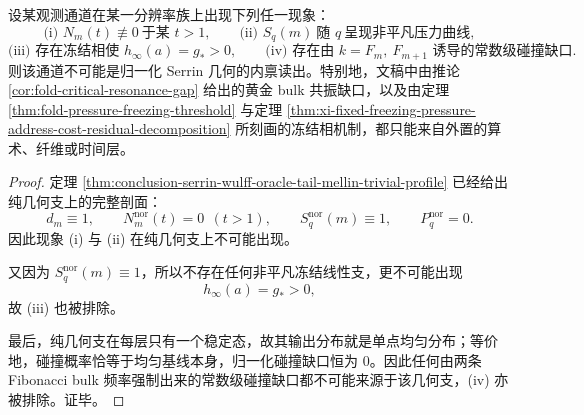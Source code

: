 \begin{corollary}\label{cor:conclusion-serrin-wulff-nontrivial-signatures-external-only}
设某观测通道在某一分辨率族上出现下列任一现象：
\[
\text{(i) }N_m(t)\not\equiv 0\ \text{于某 }t>1,
\qquad
\text{(ii) }S_q(m)\ \text{随 }q\ \text{呈现非平凡压力曲线},
\]
\[
\text{(iii) 存在冻结相使 }h_\infty(a)=g_*>0,
\qquad
\text{(iv) 存在由 }k=F_m,\ F_{m+1}\text{ 诱导的常数级碰撞缺口}.
\]
则该通道不可能是归一化 Serrin 几何的内禀读出。特别地，文稿中由推论 \ref{cor:fold-critical-resonance-gap} 给出的黄金 bulk 共振缺口，以及由定理 \ref{thm:fold-pressure-freezing-threshold} 与定理 \ref{thm:xi-fixed-freezing-pressure-address-cost-residual-decomposition} 所刻画的冻结相机制，都只能来自外置的算术、纤维或时间层。
\end{corollary}
\begin{proof}
定理 \ref{thm:conclusion-serrin-wulff-oracle-tail-mellin-trivial-profile} 已经给出纯几何支上的完整剖面：
\[
d_m\equiv 1,\qquad
N_m^{\mathrm{nor}}(t)=0\ \ (t>1),\qquad
S_q^{\mathrm{nor}}(m)\equiv 1,\qquad
P_q^{\mathrm{nor}}=0.
\]
因此现象 (i) 与 (ii) 在纯几何支上不可能出现。

又因为 \(S_q^{\mathrm{nor}}(m)\equiv 1\)，所以不存在任何非平凡冻结线性支，更不可能出现
\[
h_\infty(a)=g_*>0,
\]
故 (iii) 也被排除。

最后，纯几何支在每层只有一个稳定态，故其输出分布就是单点均匀分布；等价地，碰撞概率恰等于均匀基线本身，归一化碰撞缺口恒为 \(0\)。因此任何由两条 Fibonacci bulk 频率强制出来的常数级碰撞缺口都不可能来源于该几何支，(iv) 亦被排除。证毕。
\end{proof}

